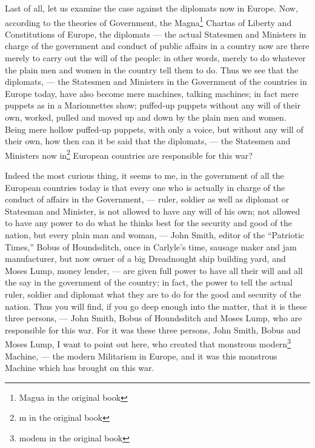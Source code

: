 Last of all, let us examine the case against the diplomats now in Europe.
Now, according to the theories of Government, the Magna\footnote{Magua in the original book} Chartas of Liberty and Constitutions of Europe, the diplomats --- the actual Statesmen and Ministers in charge of the government and conduct of public affairs in a country now are there merely to carry out the will of the people: in other words, merely to do whatever the plain men and women in the country tell them to do.
Thus we see that the diplomats, --- the Statesmen and Ministers in the Government of the countries in Europe today, have also become mere machines, talking machines; in fact mere puppets as in a Marionnettes show; puffed-up puppets without any will of their own, worked, pulled and moved up and down by the plain men and women.
Being mere hollow puffed-up puppets, with only a voice, but without any will of their own, how then can it be said that the diplomats, --- the Statesmen and Ministers now in\footnote{m in the original book} European countries are responsible for this war?

Indeed the most curious thing, it seems to me, in the government of all the European countries today is that every one who is actually in charge of the conduct of affairs in the Government, --- ruler, soldier as well as diplomat or Statesman and Minister, is not allowed to have any will of his own; not allowed to have any power to do what he thinks best for the security and good of the nation, but every plain man and woman, --- John Smith, editor of the ``Patriotic Times,'' Bobus of Houndsditch, once in Carlyle's  time, sausage maker and jam manufacturer, but now owner of a big Dreadnought ship building yard, and Moses Lump, money lender, --- are given full power to have all their will and all the say in the government of the country; in fact, the power to tell the actual ruler, soldier and diplomat what they are to do for the good and security of the nation.
Thus you will find, if you go deep enough into the matter, that it is these three persons, --- John Smith, Bobus of Houndsditch and Moses Lump, who are responsible for this war.
For it was these three persons, John Smith, Bobus and Moses Lump, I want to point out here, who created that monstrous modern\footnote{modem in the original book} Machine, --- the modern Militarism in Europe, and it was this monstrous Machine which has brought on this war.

